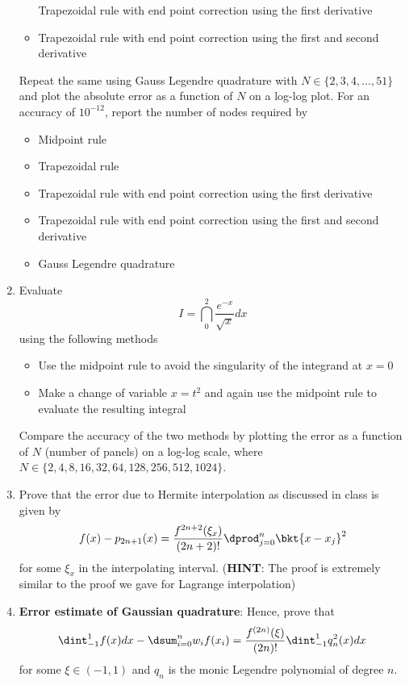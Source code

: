 \documentclass{article}
\begin{document}
\begin{enumerate}
\begin{itemize}
			Trapezoidal rule with end point correction using the first derivative
			\item
			Trapezoidal rule with end point correction using the first and second derivative
		\end{itemize}
		Repeat the same using Gauss Legendre quadrature with $N \in \{2,3,4,\ldots,51\}$ and plot the absolute error as a function of $N$ on a log-log plot. For an accuracy of $10^{-12}$, report the number of nodes required by
		\begin{itemize}
			\item
			Midpoint rule
			\item
			Trapezoidal rule
			\item
			Trapezoidal rule with end point correction using the first derivative
			\item
			Trapezoidal rule with end point correction using the first and second derivative
			\item
			Gauss Legendre quadrature
		\end{itemize}
		\item
		Evaluate
		$$I = \dint_0^2 \dfrac{e^{-x}}{\sqrt{x}}dx$$
		using the following methods
		\begin{itemize}
			\item
			Use the midpoint rule to avoid the singularity of the integrand at $x=0$
			\item
			Make a change of variable $x=t^2$ and again use the midpoint rule to evaluate the resulting integral
		\end{itemize}
		Compare the accuracy of the two methods by plotting the error as a function of $N$ (number of panels) on a log-log scale, where $N \in \{2,4,8,16,32,64,128,256,512,1024\}$.
		\item
		Prove that the error due to Hermite interpolation as discussed in class is given by
		$$f(x) - p_{2n+1}(x) = \dfrac{f^{2n+2}(\xi_x)}{(2n+2)!} \dprod_{j=0}^n \bkt{x-x_j}^2$$
		for some $\xi_x$ in the interpolating interval. (\textbf{HINT}: The proof is extremely similar to the proof we gave for Lagrange interpolation)
		\item
		\textbf{Error estimate of Gaussian quadrature}: Hence, prove that
		$$\dint_{-1}^1 f(x) dx - \dsum_{i=0}^{n}w_i f(x_i) = \dfrac{f^{(2n)}(\xi)}{(2n)!} \dint_{-1}^1 q_n^2(x)dx$$
		for some $\xi \in (-1,1)$ and $q_n$ is the monic Legendre polynomial of degree $n$.
	\end{enumerate}
\end{document}
